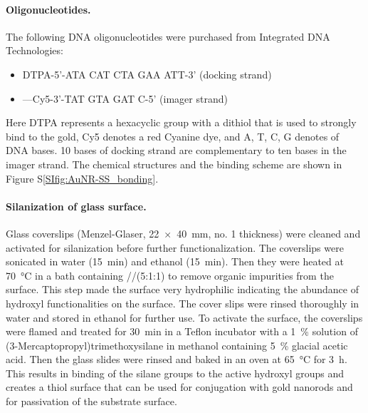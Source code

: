 \paragraph*{Oligonucleotides.} The following DNA oligonucleotides were purchased from Integrated DNA Technologies:
\begin{itemize}
	\item DTPA-5'-ATA CAT CTA GAA ATT-3' (docking strand)
	\item ---Cy5-3'-TAT GTA GAT C-5' (imager strand)
\end{itemize}
Here DTPA represents a hexacyclic group with a dithiol that is used to strongly bind to the gold, Cy5 denotes a red Cyanine dye, and A, T, C, G denotes of DNA bases. 10 bases of docking strand are complementary to ten bases in the imager strand. The chemical structures and the binding scheme are shown in Figure S\ref{SIfig:AuNR-SS_bonding}.


\paragraph*{Silanization of glass surface.} Glass coverslips (Menzel-Glaser, \SI[product-units=repeat]{22x40}{\mm}, no. 1 thickness) were cleaned and activated for silanization before further functionalization.
The coverslips were sonicated in water (\SI{15}{\minute}) and ethanol (\SI{15}{\minute}). 
Then they were heated  at \SI{70}{\celsius} in a bath containing //(5:1:1) to remove organic impurities from the surface.
This step made the surface very hydrophilic indicating the abundance of hydroxyl functionalities on the surface.
The cover slips were rinsed thoroughly in water and stored in ethanol for further use.
To activate the surface, the coverslips were flamed and treated for 30~min in a Teflon incubator with a \SI{1}{\percent} solution of (3-Mercaptopropyl)trimethoxysilane in methanol containing \SI{5}{\percent} glacial acetic acid.
Then the glass slides were rinsed and baked in an oven at \SI{65}{\celsius} for \SI{3}{\hour}.
This results in binding of the silane groups to the active hydroxyl groups and creates a thiol surface that can be used for conjugation with gold nanorods and for passivation of the substrate surface.


